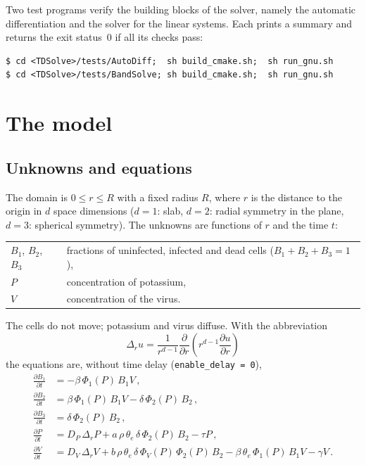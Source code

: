 \documentclass[11pt]{article}
\newcommand{\code}[1]{\texttt{#1}}
\newcommand{\pp}[2]{\frac{\partial #1}{\partial #2}}
\newcommand{\thetae}{\theta_e}
\begin{document}
Two test programs verify the building blocks of the solver, namely the automatic differentiation and the solver for the linear systems.
Each prints a summary and returns the exit status~0 if all its checks pass:
\begin{lstlisting}
$ cd <TDSolve>/tests/AutoDiff;  sh build_cmake.sh;  sh run_gnu.sh
$ cd <TDSolve>/tests/BandSolve; sh build_cmake.sh;  sh run_gnu.sh
\end{lstlisting}

\section{The model}
\label{sec:model}

\subsection{Unknowns and equations}
The domain is $0\le r\le R$ with a fixed radius $R$, where $r$ is the distance to the origin in $d$ space dimensions ($d=1$: slab, $d=2$: radial symmetry in the plane, $d=3$: spherical symmetry).
The unknowns are functions of $r$ and the time $t$:
\begin{center}
\begin{tabular}{ll}
  $B_1$, $B_2$, $B_3$ & fractions of uninfected, infected and dead cells ($B_1+B_2+B_3=1$), \\
  $P$ & concentration of potassium, \\
  $V$ & concentration of the virus.
\end{tabular}
\end{center}
The cells do not move; potassium and virus diffuse.
With the abbreviation
\begin{equation*}
  \Delta_r u = \frac{1}{r^{d-1}}\pp{}{r}\left(r^{d-1}\pp{u}{r}\right)
\end{equation*}
the equations are, without time delay (\code{enable\_delay = 0}),
\begin{align}
  \pp{B_1}{t} &= -\beta\,\Phi_1(P)\,B_1V\,, \label{eq:b1}\\
  \pp{B_2}{t} &= \beta\,\Phi_1(P)\,B_1V - \delta\,\Phi_2(P)\,B_2\,, \label{eq:b2}\\
  \pp{B_3}{t} &= \delta\,\Phi_2(P)\,B_2\,, \label{eq:b3}\\
  \pp{P}{t} &= D_P\,\Delta_rP + a\,\rho\,\thetae\,\delta\,\Phi_2(P)\,B_2 - \tau P\,, \label{eq:p}\\
  \pp{V}{t} &= D_V\,\Delta_rV + b\,\rho\,\thetae\,\delta\,\Phi_V(P)\,\Phi_2(P)\,B_2 - \beta\,\thetae\,\Phi_1(P)\,B_1V - \gamma V\,. \label{eq:v}
\end{align}
\end{document}
